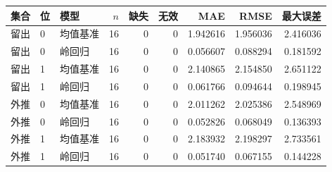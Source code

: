 \begin{tabular}{lllrrrrrr}
\toprule
集合 & 位 & 模型 & $n$ & 缺失 & 无效 & MAE & RMSE & 最大误差\\
\midrule
留出 & 0 & 均值基准 & 16 & 0 & 0 & 1.942616 & 1.956036 & 2.416036\\
留出 & 0 & 岭回归 & 16 & 0 & 0 & 0.056607 & 0.088294 & 0.181592\\
留出 & 1 & 均值基准 & 16 & 0 & 0 & 2.140865 & 2.154850 & 2.651122\\
留出 & 1 & 岭回归 & 16 & 0 & 0 & 0.061766 & 0.094644 & 0.198945\\
外推 & 0 & 均值基准 & 16 & 0 & 0 & 2.011262 & 2.025386 & 2.548969\\
外推 & 0 & 岭回归 & 16 & 0 & 0 & 0.052826 & 0.068049 & 0.136393\\
外推 & 1 & 均值基准 & 16 & 0 & 0 & 2.183932 & 2.198297 & 2.733561\\
外推 & 1 & 岭回归 & 16 & 0 & 0 & 0.051740 & 0.067155 & 0.144228\\
\bottomrule
\end{tabular}
